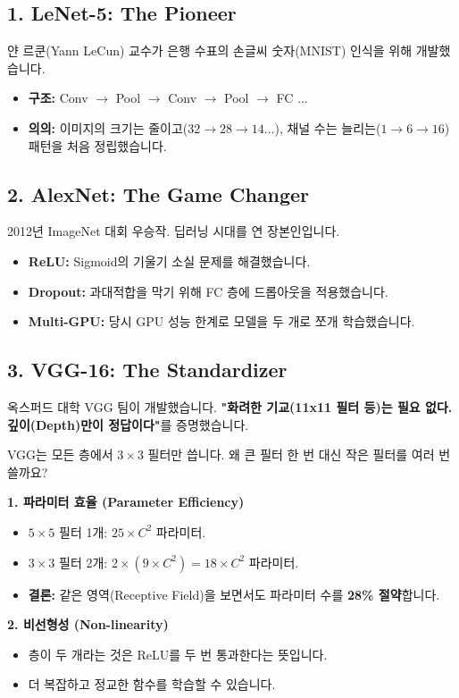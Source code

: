 \documentclass[11pt,a4paper]{book}
\theoremstyle{definition}
\begin{document}
\subsection{1. LeNet-5: The Pioneer}

얀 르쿤(Yann LeCun) 교수가 은행 수표의 손글씨 숫자(MNIST) 인식을 위해 개발했습니다.
\begin{itemize}
    \item \textbf{구조:} Conv $\to$ Pool $\to$ Conv $\to$ Pool $\to$ FC ...
    \item \textbf{의의:} 이미지의 크기는 줄이고($32 \to 28 \to 14 \dots$), 채널 수는 늘리는($1 \to 6 \to 16$) 패턴을 처음 정립했습니다.
\end{itemize}

\subsection{2. AlexNet: The Game Changer}

2012년 ImageNet 대회 우승작. 딥러닝 시대를 연 장본인입니다.
\begin{itemize}
    \item \textbf{ReLU:} Sigmoid의 기울기 소실 문제를 해결했습니다.
    \item \textbf{Dropout:} 과대적합을 막기 위해 FC 층에 드롭아웃을 적용했습니다.
    \item \textbf{Multi-GPU:} 당시 GPU 성능 한계로 모델을 두 개로 쪼개 학습했습니다.
\end{itemize}

\subsection{3. VGG-16: The Standardizer}

옥스퍼드 대학 VGG 팀이 개발했습니다. \textbf{"화려한 기교(11x11 필터 등)는 필요 없다. 깊이(Depth)만이 정답이다"}를 증명했습니다.

\begin{mathbox}[title={Why $3 \times 3$ filters?}]
VGG는 모든 층에서 $3 \times 3$ 필터만 씁니다. 왜 큰 필터 한 번 대신 작은 필터를 여러 번 쓸까요?

\textbf{1. 파라미터 효율 (Parameter Efficiency)}
\begin{itemize}
    \item $5 \times 5$ 필터 1개: $25 \times C^2$ 파라미터.
    \item $3 \times 3$ 필터 2개: $2 \times (9 \times C^2) = 18 \times C^2$ 파라미터.
    \item \textbf{결론:} 같은 영역(Receptive Field)을 보면서도 파라미터 수를 \textbf{28\% 절약}합니다.
\end{itemize}

\textbf{2. 비선형성 (Non-linearity)}
\begin{itemize}
    \item 층이 두 개라는 것은 ReLU를 두 번 통과한다는 뜻입니다.
    \item 더 복잡하고 정교한 함수를 학습할 수 있습니다.
\end{itemize}
\end{mathbox}
\end{document}
